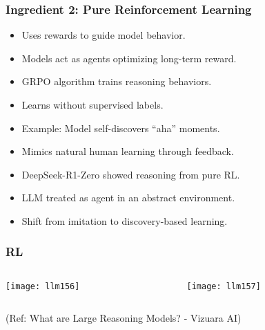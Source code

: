 \begin{frame}[fragile]\frametitle{Ingredient 2: Pure Reinforcement Learning}
\begin{itemize}
  \item Uses rewards to guide model behavior.
  \item Models act as agents optimizing long-term reward.
  \item GRPO algorithm trains reasoning behaviors.
  \item Learns without supervised labels.
  \item Example: Model self-discovers “aha” moments.
  \item Mimics natural human learning through feedback.
  \item DeepSeek-R1-Zero showed reasoning from pure RL.
  \item LLM treated as agent in an abstract environment.
  \item Shift from imitation to discovery-based learning.
\end{itemize}
\end{frame}

\begin{frame}[fragile]\frametitle{RL}


\begin{columns}
    \begin{column}[T]{0.5\linewidth}
		\begin{center}
		\texttt{[image: llm156]}
		\end{center}

    \end{column}
    \begin{column}[T]{0.5\linewidth}
		\begin{center}
		\texttt{[image: llm157]}
		\end{center}
    \end{column}
  \end{columns}
  

{\tiny (Ref: What are Large Reasoning Models? - Vizuara AI)}

\end{frame}


